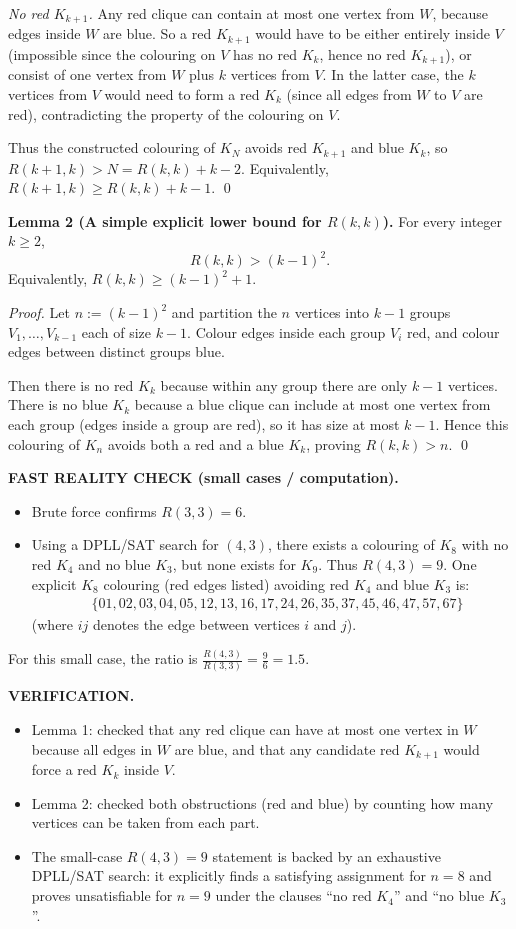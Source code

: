 \emph{No red $K_{k+1}$.}
Any red clique can contain at most one vertex from $W$, because edges inside $W$ are blue.
So a red $K_{k+1}$ would have to be either entirely inside $V$ (impossible since the colouring on $V$ has no red $K_k$, hence no red $K_{k+1}$),
or consist of one vertex from $W$ plus $k$ vertices from $V$.
In the latter case, the $k$ vertices from $V$ would need to form a red $K_k$ (since all edges from $W$ to $V$ are red), contradicting the property of the colouring on $V$.

Thus the constructed colouring of $K_N$ avoids red $K_{k+1}$ and blue $K_k$, so $R(k+1,k) > N = R(k,k)+k-2$.
Equivalently, $R(k+1,k)\ge R(k,k)+k-1$.
\qed

\medskip
\textbf{Lemma 2 (A simple explicit lower bound for $R(k,k)$).}
For every integer $k\ge 2$,
\[
R(k,k) > (k-1)^2.
\]
Equivalently, $R(k,k)\ge (k-1)^2+1$.

\emph{Proof.}
Let $n:=(k-1)^2$ and partition the $n$ vertices into $k-1$ groups $V_1,\dots,V_{k-1}$ each of size $k-1$.
Colour edges inside each group $V_i$ red, and colour edges between distinct groups blue.

Then there is no red $K_k$ because within any group there are only $k-1$ vertices.
There is no blue $K_k$ because a blue clique can include at most one vertex from each group (edges inside a group are red), so it has size at most $k-1$.
Hence this colouring of $K_n$ avoids both a red and a blue $K_k$, proving $R(k,k)>n$.
\qed

\medskip
\textbf{FAST REALITY CHECK (small cases / computation).}
\begin{itemize}
\item Brute force confirms $R(3,3)=6$.
\item Using a DPLL/SAT search for $(4,3)$, there exists a colouring of $K_8$ with no red $K_4$ and no blue $K_3$, but none exists for $K_9$.
Thus $R(4,3)=9$.
One explicit $K_8$ colouring (red edges listed) avoiding red $K_4$ and blue $K_3$ is:
\[\begin{aligned}
&\{01,02,03,04,05,12,13,16,17,24,26,35,37,45,46,47,57,67\}
\end{aligned}\]
(where $ij$ denotes the edge between vertices $i$ and $j$).
\end{itemize}
For this small case, the ratio is $\frac{R(4,3)}{R(3,3)}=\frac{9}{6}=1.5$.

\textbf{VERIFICATION.}
\begin{itemize}
\item Lemma 1: checked that any red clique can have at most one vertex in $W$ because all edges in $W$ are blue, and that any candidate red $K_{k+1}$ would force a red $K_k$ inside $V$.
\item Lemma 2: checked both obstructions (red and blue) by counting how many vertices can be taken from each part.
\item The small-case $R(4,3)=9$ statement is backed by an exhaustive DPLL/SAT search: it explicitly finds a satisfying assignment for $n=8$ and proves unsatisfiable for $n=9$ under the clauses ``no red $K_4$'' and ``no blue $K_3$''.
\end{itemize}

